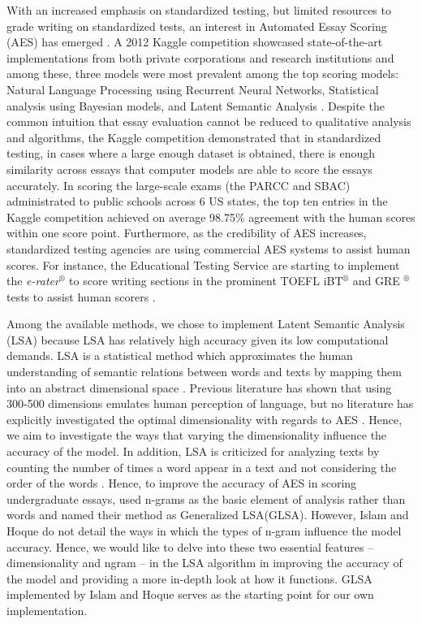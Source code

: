 \documentclass[10pt,letterpaper]{article}
\begin{document}
With an increased emphasis on standardized testing, but limited resources to grade writing on standardized tests, an interest in Automated Essay Scoring (AES) has emerged \cite{shermis2014state}. A 2012 Kaggle competition showcased state-of-the-art implementations from both private corporations and research institutions and among these, three models were most prevalent among the top scoring models: Natural Language Processing using Recurrent Neural Networks, Statistical analysis using Bayesian models, and Latent Semantic Analysis \cite{shermis2014state}. Despite the common intuition that essay evaluation cannot be reduced to qualitative analysis and algorithms, the Kaggle competition demonstrated that in standardized testing, in cases where a large enough dataset is obtained, there is enough similarity across essays that computer models are able to score the essays accurately. In scoring the large-scale exams (the PARCC and SBAC) administrated to public schools across 6 US states, the top ten entries in the Kaggle competition achieved on average 98.75\% agreement with the human scores within one score point\cite{shermis2014state}. Furthermore, as the credibility of AES increases, standardized testing agencies are using commercial AES systems to assist human scores\cite{shermis2014state}. For instance, the Educational Testing Service are starting to implement the \textit{e-rater}$^{\circledR}$ to score writing sections in the prominent TOEFL iBT$^{\circledR}$ and GRE $^{\circledR}$ tests to assist human scorers \cite{ets2019aes}.

Among the available methods, we chose to implement Latent Semantic Analysis (LSA) because LSA has relatively high accuracy given its low computational demands. LSA is a statistical method which approximates the human understanding of semantic relations between words and texts by mapping them into an abstract dimensional space \cite{kintsch2002potential}. Previous literature has shown that using 300-500 dimensions emulates human perception of language, but no literature has explicitly investigated the optimal dimensionality with regards to AES \cite{kintsch2002potential}. Hence, we aim to  investigate the ways that varying the dimensionality influence the accuracy of the model. In addition, LSA is criticized for analyzing texts by counting the number of times a word appear in a text and not considering the order of the words \cite{kintsch2002potential}. Hence, to improve the accuracy of AES in scoring undergraduate essays,  used n-grams as the basic element of analysis rather than words and named their method as Generalized LSA(GLSA). However, Islam and Hoque do not detail the ways in which the types of n-gram influence the model accuracy. Hence, we would like to delve into these two essential features -- dimensionality and ngram -- in the LSA algorithm in improving the accuracy of the model and providing a more in-depth look at how it functions. GLSA implemented by Islam and Hoque serves as the starting point for our own implementation. 
\end{document}
